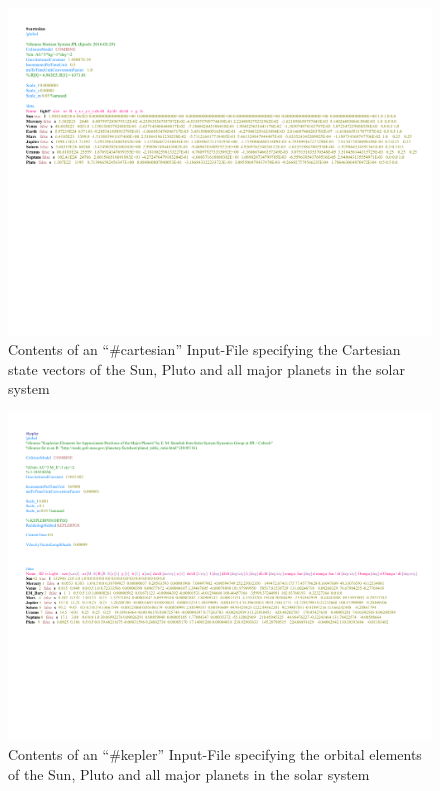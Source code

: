\documentclass[a4paper,onesided,10pt]{article}
\begin{document}
\begin{figure}
	\centering
		\includegraphics[width=1.6\textwidth, angle=90]{inputPlanetHorizen.pdf}
	\caption{Contents of an "`\#cartesian"' Input-File specifying the Cartesian state vectors of the Sun, Pluto and all major planets in the solar system}
	\label{fig:inputPlanetHorizen}
\end{figure}

\begin{figure}
	\centering
		\includegraphics[width=1.6\textwidth, angle=90]{keplerModle.pdf}
	\caption{Contents of an "`\#kepler"' Input-File specifying the orbital elements of the Sun, Pluto and all major planets in the solar system}
	\label{fig:keplerModle}
\end{figure}
\end{document}
